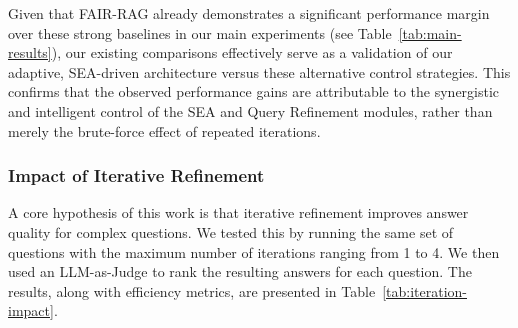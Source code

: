 \documentclass[11pt]{article}
\begin{document}
Given that FAIR-RAG already demonstrates a significant performance margin over these strong baselines in our main experiments (see Table~\ref{tab:main-results}), our existing comparisons effectively serve as a validation of our adaptive, SEA-driven architecture versus these alternative control strategies. This confirms that the observed performance gains are attributable to the synergistic and intelligent control of the SEA and Query Refinement modules, rather than merely the brute-force effect of repeated iterations.

\subsubsection{Impact of Iterative Refinement}
\label{sec:iterative-impact}

A core hypothesis of this work is that iterative refinement improves answer quality for complex questions. We tested this by running the same set of questions with the maximum number of iterations ranging from 1 to 4. We then used an LLM-as-Judge to rank the resulting answers for each question. The results, along with efficiency metrics, are presented in Table~\ref{tab:iteration-impact}.
\end{document}
